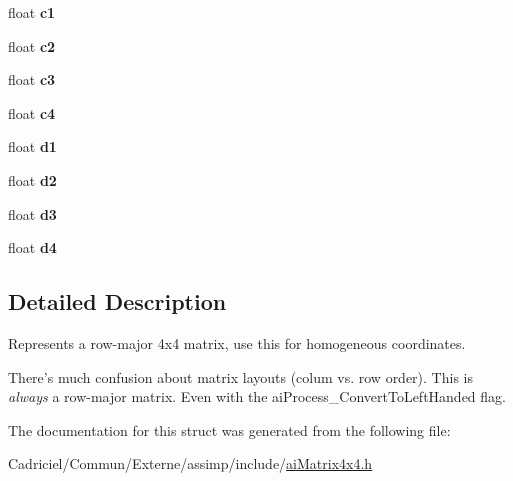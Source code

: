 \begin{DoxyCompactItemize}
\item 
\hypertarget{structai_matrix4x4_a63c847f6e86653143aa659f13c154e2b}{float {\bfseries c1}}\label{structai_matrix4x4_a63c847f6e86653143aa659f13c154e2b}

\item 
\hypertarget{structai_matrix4x4_a67425f81054b1097c29b73bf317cfeeb}{float {\bfseries c2}}\label{structai_matrix4x4_a67425f81054b1097c29b73bf317cfeeb}

\item 
\hypertarget{structai_matrix4x4_aec8c5745b90139d472eb4e91f1373c1a}{float {\bfseries c3}}\label{structai_matrix4x4_aec8c5745b90139d472eb4e91f1373c1a}

\item 
\hypertarget{structai_matrix4x4_a7e3288f38a4e00d55c02272e1582e462}{float {\bfseries c4}}\label{structai_matrix4x4_a7e3288f38a4e00d55c02272e1582e462}

\item 
\hypertarget{structai_matrix4x4_a13f3800d9106e3be6d0e60b794c5a5ae}{float {\bfseries d1}}\label{structai_matrix4x4_a13f3800d9106e3be6d0e60b794c5a5ae}

\item 
\hypertarget{structai_matrix4x4_a6f17ca1c7e4b9377d0e332f85aab282b}{float {\bfseries d2}}\label{structai_matrix4x4_a6f17ca1c7e4b9377d0e332f85aab282b}

\item 
\hypertarget{structai_matrix4x4_a8d2910f62b34b1e2ace93b55e4db4b92}{float {\bfseries d3}}\label{structai_matrix4x4_a8d2910f62b34b1e2ace93b55e4db4b92}

\item 
\hypertarget{structai_matrix4x4_ac0a65b51f126f7331b4f7dbbd82f3d63}{float {\bfseries d4}}\label{structai_matrix4x4_ac0a65b51f126f7331b4f7dbbd82f3d63}

\end{DoxyCompactItemize}


\subsection{Detailed Description}
Represents a row-\/major 4x4 matrix, use this for homogeneous coordinates. 

There's much confusion about matrix layouts (colum vs. row order). This is {\itshape always} a row-\/major matrix. Even with the ai\-Process\-\_\-\-Convert\-To\-Left\-Handed flag. 

The documentation for this struct was generated from the following file\-:\begin{DoxyCompactItemize}
\item 
Cadriciel/\-Commun/\-Externe/assimp/include/\hyperlink{ai_matrix4x4_8h}{ai\-Matrix4x4.\-h}\end{DoxyCompactItemize}
